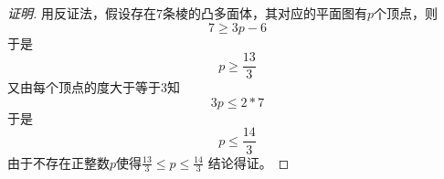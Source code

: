 \begin{proof}[证明]
  用反证法，假设存在$7$条棱的凸多面体，其对应的平面图有$p$个顶点，则
  \[7 \geq 3p - 6\]
  于是
  \[p \geq \frac{13}{3}\]
  又由每个顶点的度大于等于$3$知
  \[3p \leq 2 * 7\]
  于是
  \[p \leq \frac{14}{3}\]
  由于不存在正整数$p$使得$\frac{13}{3} \leq p \leq \frac{14}{3}$
  结论得证。
\end{proof}
